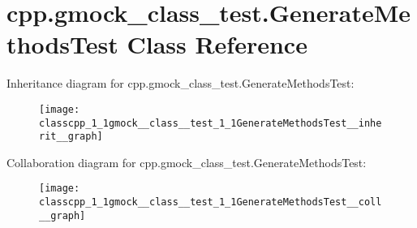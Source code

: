 \hypertarget{classcpp_1_1gmock__class__test_1_1GenerateMethodsTest}{}\section{cpp.\+gmock\+\_\+class\+\_\+test.\+Generate\+Methods\+Test Class Reference}
\label{classcpp_1_1gmock__class__test_1_1GenerateMethodsTest}


Inheritance diagram for cpp.\+gmock\+\_\+class\+\_\+test.\+Generate\+Methods\+Test\+:\nopagebreak
\begin{figure}[H]
\begin{center}
\leavevmode
\texttt{[image: classcpp\_1\_1gmock\_\_class\_\_test\_1\_1GenerateMethodsTest\_\_inherit\_\_graph]}
\end{center}
\end{figure}


Collaboration diagram for cpp.\+gmock\+\_\+class\+\_\+test.\+Generate\+Methods\+Test\+:\nopagebreak
\begin{figure}[H]
\begin{center}
\leavevmode
\texttt{[image: classcpp\_1\_1gmock\_\_class\_\_test\_1\_1GenerateMethodsTest\_\_coll\_\_graph]}
\end{center}
\end{figure}
